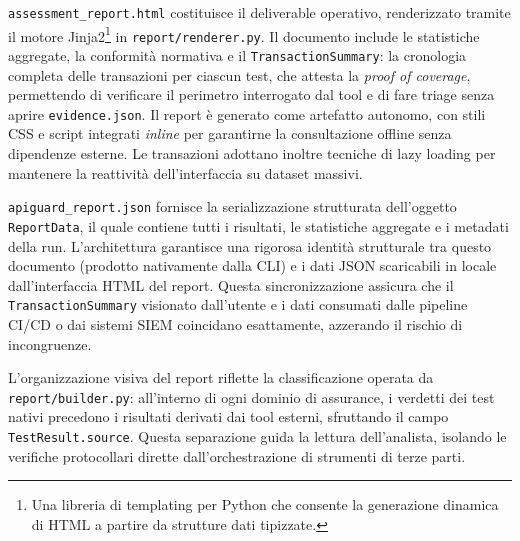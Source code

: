 \texttt{assessment\_report.html} costituisce il deliverable operativo, renderizzato tramite il motore Jinja2\footnote{Una libreria di templating per Python che consente la generazione dinamica di \gls{HTML} a partire da strutture dati tipizzate.} in \texttt{report/renderer.py}. Il documento include le statistiche aggregate, la conformità normativa e il \texttt{TransactionSummary}: la cronologia completa delle transazioni per ciascun test, che attesta la \textit{proof of coverage}, permettendo di verificare il perimetro interrogato dal tool e di fare triage senza aprire \texttt{evidence.json}. Il report è generato come artefatto autonomo, con stili \gls{CSS} e script integrati \textit{inline} per garantirne la consultazione offline senza dipendenze esterne. Le transazioni adottano inoltre tecniche di lazy loading per mantenere la reattività dell'interfaccia su dataset massivi.


\texttt{apiguard\_report.json} fornisce la serializzazione strutturata dell'oggetto \texttt{ReportData}, il quale contiene tutti i risultati, le statistiche aggregate e i metadati della run. L'architettura garantisce una rigorosa identità strutturale tra questo documento (prodotto nativamente dalla \gls{CLI}) e i dati \gls{JSON} scaricabili in locale dall'interfaccia \gls{HTML} del report. Questa sincronizzazione assicura che il \texttt{TransactionSummary} visionato dall'utente e i dati consumati dalle pipeline \gls{CI/CD} o dai sistemi \gls{SIEM} coincidano esattamente, azzerando il rischio di incongruenze.

L'organizzazione visiva del report riflette la classificazione operata da \texttt{report/builder.py}: all'interno di ogni dominio di assurance, i verdetti dei test nativi precedono i risultati derivati dai tool esterni, sfruttando il campo \texttt{TestResult.source}. Questa separazione guida la lettura dell'analista, isolando le verifiche protocollari dirette dall'orchestrazione di strumenti di terze parti.
